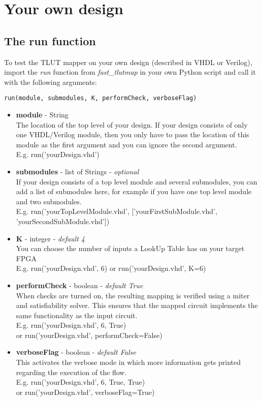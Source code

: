 \documentclass[a4paper,oneside]{memoir}
\begin{document}
\clearpage
\chapter{Your own design}\label{sec:experiment}
\section{The run function}\label{sec:run_function}
To test the TLUT mapper on your own design (described in VHDL or Verilog), import the \emph{run} function from \emph{fast\_tlutmap} in your own Python script and call it with the following arguments:
\begin{lstlisting}
run(module, submodules, K, performCheck, verboseFlag)
\end{lstlisting}
\begin{itemize}
\item \textbf{module} - String\\
The location of the top level of your design. If your design consists of only one VHDL/Verilog module, then you only have to pass the location of this module as the first argument and you can ignore the second argument.\\

E.g. run('yourDesign.vhd')

\item \textbf{submodules} - list of Strings - \textit{optional}\\
If your design consists of a top level module and several submodules, you can add a list of submodules here, for example if you have one top level module and two submodules.\\

E.g. run('yourTopLevelModule.vhd', ['yourFirstSubModule.vhd', 'yourSecondSubModule.vhd'])

\item \textbf{K} - integer - \textit{default 4}\\
You can choose the number of inputs a LookUp Table has on your target FPGA\\

E.g. run('yourDesign.vhd', 6)
or run('yourDesign.vhd', K=6)

\item \textbf{performCheck} - boolean - \textit{default True}\\
When checks are turned on, the resulting mapping is verified using a miter and satisfiability solver. This ensures that the mapped circuit implements the same functionality as the input circuit.\\

E.g. run('yourDesign.vhd', 6, True)\\
or run('yourDesign.vhd', performCheck=False)

\item \textbf{verboseFlag} - boolean - \textit{default False}\\
This activates the verbose mode in which more information gets printed regarding the execution of the flow.\\
E.g. run('yourDesign.vhd', 6, True, True)\\ or run('yourDesign.vhd', verboseFlag=True)
\end{itemize}
\end{document}
